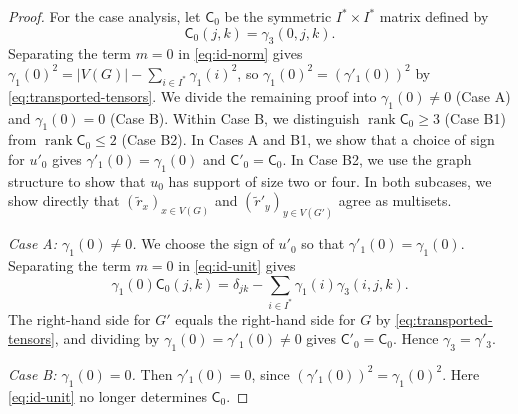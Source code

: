 \documentclass[11pt,a4paper]{article}
\theoremstyle{plain}
\theoremstyle{definition}
\DeclareMathOperator{\rank}{rank}
\begin{document}
\begin{proof}
  For the case analysis, let $\mathsf C_0$ be the symmetric
  $I^*\times I^*$ matrix defined by
  \begin{equation}\label{eq:unknowns}
    \mathsf C_0(j,k) = \gamma_3(0,j,k).
  \end{equation}
  Separating the term $m=0$ in \cref{eq:id-norm} gives
  $\gamma_1(0)^2=|V(G)|-\sum_{i\in I^*}\gamma_1(i)^2$, so
  $\gamma_1(0)^2=(\gamma'_1(0))^2$ by \cref{eq:transported-tensors}.
  We divide the remaining proof into $\gamma_1(0)\ne0$ (Case A)
  and $\gamma_1(0)=0$ (Case B).
  Within Case B, we distinguish $\rank\mathsf C_0\geq3$ (Case B1)
  from $\rank\mathsf C_0\leq2$ (Case B2).
  In Cases A and B1, we show that a choice of sign for $u'_0$ gives
  $\gamma'_1(0)=\gamma_1(0)$ and $\mathsf C'_0=\mathsf C_0$.
  In Case B2, we use the graph structure to show that $u_0$ has
  support of size two or four. In both subcases, we show directly
  that $(\tilde{r}_x)_{x\in V(G)}$ and $(\tilde{r}'_y)_{y\in V(G')}$ agree as multisets.

  \emph{Case A: $\gamma_1(0) \neq 0$.} We choose the sign of $u'_0$ so
  that $\gamma'_1(0)=\gamma_1(0)$. Separating the term $m=0$ in
  \cref{eq:id-unit} gives
  \begin{equation}
    \label{eq:caseA}
    \gamma_1(0) \mathsf{C}_0(j,k) = \delta_{jk} - \sum_{i \in I^{*}} \gamma_1(i) \gamma_3(i,j,k).
  \end{equation}
  The right-hand side for $G'$ equals the right-hand side for $G$ by
  \cref{eq:transported-tensors}, and dividing by
  $\gamma_1(0)=\gamma'_1(0)\neq0$ gives $\mathsf C'_0=\mathsf C_0$.
  Hence $\gamma_3=\gamma'_3$.

  \emph{Case B: $\gamma_1(0) = 0$.} Then $\gamma'_1(0)=0$, since
  $(\gamma'_1(0))^2=\gamma_1(0)^2$. Here \cref{eq:id-unit} no longer
  determines $\mathsf C_0$.


\end{proof}
\end{document}
